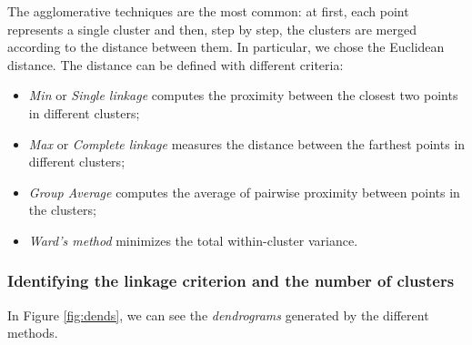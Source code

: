 \documentclass[a4paper,11pt,dvipsnames]{article}
\begin{document}
The agglomerative techniques are the most common: at first, each point represents a single cluster and then, step by step, the clusters are merged according to the distance between them. In particular, we chose the Euclidean distance. 
\newpage
The distance can be defined with different criteria: 
\begin{itemize}
    \item \textit{Min} or \textit{Single linkage} computes the proximity between the closest two points in different clusters;
    \item \textit{Max} or \textit{Complete linkage} measures the distance between the farthest points in different clusters;
    \item \textit{Group Average} computes the average of pairwise proximity between points in the clusters;
    \item \textit{Ward's method} minimizes the total within-cluster variance.
\end{itemize}

\subsubsection{Identifying the linkage criterion and the number of clusters}
 In Figure \ref{fig:dends}, we can see the \textit{dendrograms} generated by the different methods.
\end{document}
